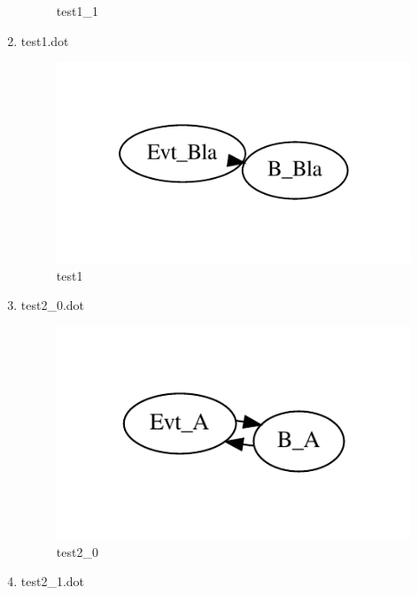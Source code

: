\documentclass[12pt,a4paper]{report}
\begin{document}
\begin{enumerate}
\begin{figure}
        \caption{test1\_1}
        \label{fig:test1_1}
    \end{figure}
\item test1.dot
    \begin{figure}
        \centering 
        \includegraphics*[width=1.0\textwidth,keepaspectratio]{TestPattern/test1.pdf}
        \caption{test1}
        \label{fig:test1}
    \end{figure}
\item test2\_0.dot
    \begin{figure}
        \centering 
        \includegraphics*[width=1.0\textwidth,keepaspectratio]{TestPattern/test2_0.pdf}
        \caption{test2\_0}
        \label{fig:test2_0}
    \end{figure}
\item test2\_1.dot
    \begin{figure}
        \centering 

\end{figure}
\end{enumerate}
\end{document}

